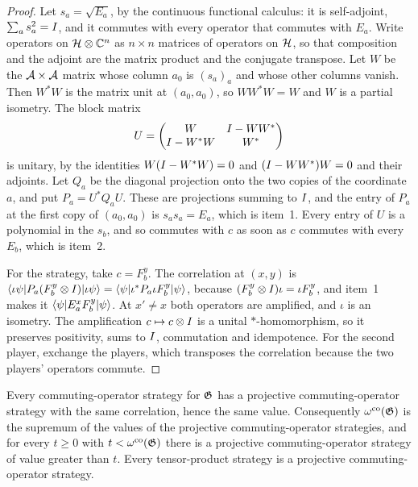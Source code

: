 \begin{proof}
\leanok
Let $s_a = \sqrt{E_a}$, by the continuous functional calculus: it is self-adjoint, $\sum_a s_a^2
= I$, and it commutes with every operator that commutes with $E_a$. Write operators on $\mathcal{H}
\otimes \mathbb{C}^n$ as $n \times n$ matrices of operators on $\mathcal{H}$, so that composition and the adjoint
are the matrix product and the conjugate transpose. Let $W$ be the $\mathcal{A} \times \mathcal{A}$ matrix whose
column $a_0$ is $(s_a)_a$ and whose other columns vanish. Then $W^* W$ is the matrix unit at
$(a_0, a_0)$, so $W W^* W = W$ and $W$ is a partial isometry. The block matrix
\begin{equation*}
  U = \begin{pmatrix} W & I - W W^* \\ I - W^* W & W^* \end{pmatrix}
\end{equation*}
is unitary, by the identities $W(I - W^* W) = 0$ and $(I - W W^*) W = 0$ and their adjoints.
Let $Q_a$ be the diagonal projection onto the two copies of the coordinate $a$, and put $P_a =
U^* Q_a U$. These are projections summing to $I$, and the entry of $P_a$ at the first copy of
$(a_0, a_0)$ is $s_a s_a = E_a$, which is item~1. Every entry of $U$ is a polynomial in the
$s_b$, and so commutes with $c$ as soon as $c$ commutes with every $E_b$, which is item~2.

For the strategy, take $c = F^y_b$. The correlation at $(x, y)$ is $\langle\iota\psi| P_a
(F^y_b \otimes I) |\iota\psi\rangle = \langle\psi| \iota^* P_a \iota F^y_b |\psi\rangle$, because
$(F^y_b \otimes I) \iota = \iota F^y_b$, and item~1 makes it $\langle\psi| E^x_a F^y_b
|\psi\rangle$. At $x' \neq x$ both operators are amplified, and $\iota$ is an isometry. The
amplification $c \mapsto c \otimes I$ is a unital $*$-homomorphism, so it preserves
positivity, sums to $I$, commutation and idempotence. For the second player, exchange the
players, which transposes the correlation because the two players' operators commute.
\end{proof}

\begin{theorem}
\label{thm:co-value-projective}
\leanok
Every commuting-operator strategy for $\mathfrak{G}$ has a projective commuting-operator strategy with
the same correlation, hence the same value. Consequently $\omega^{\mathrm{co}}(\mathfrak{G})$ is the supremum of the
values of the projective commuting-operator strategies, and for every $t \geq 0$ with $t <
\omega^{\mathrm{co}}(\mathfrak{G})$ there is a projective commuting-operator strategy of value greater than $t$.
Every tensor-product strategy is a projective commuting-operator strategy.
\end{theorem}

